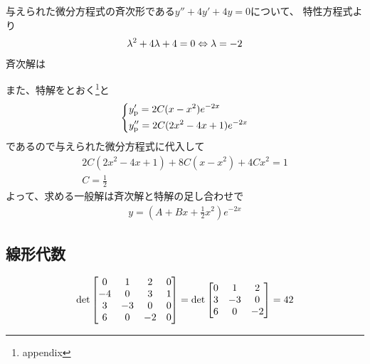 \begin{ans*}
  与えられた微分方程式の斉次形である$y'' + 4y' + 4y = 0$について、
  特性方程式より
  \begin{gather}
    {\lambda}^2+4{\lambda}+4=0\Leftrightarrow {\lambda} = -2
  \end{gather}
  斉次解は

  また、特解をとおく\footnote{appendix}と
  \begin{gather}
    \begin{dcases*}
      y'_{\rm{p}} = 2C(x-x^2)e^{-2x} \\
      y''_{\rm{p}}= 2C(2x^2-4x+1)e^{-2x}
    \end{dcases*}
  \end{gather}
  であるので与えられた微分方程式に代入して
  \begin{gather}
    2C(2x^2 - 4x + 1) + 8C(x-x^2) + 4Cx^2 = 1 \\
    C = \frac{1}{2}
  \end{gather}
  よって、求める一般解は斉次解と特解の足し合わせで
  \begin{gather}
    y = \left(A + Bx + \frac{1}{2}x^2\right)e^{-2x}
  \end{gather}
\end{ans*}



\subsection{線形代数}
\begin{ans*}
  \begin{align}
    \det
    \begin{bmatrix}
      0 & 1 & 2 & 0 \\
      -4 & 0 & 3 & 1 \\
      3 & -3 & 0 & 0 \\
      6 & 0 & -2 & 0 \\
    \end{bmatrix}
    = \det
    \begin{bmatrix}
      0  & 1  & 2  \\
      3  & -3 & 0  \\
      6  & 0  & -2 \\
    \end{bmatrix}
    = 42
  \end{align}
\end{ans*}

